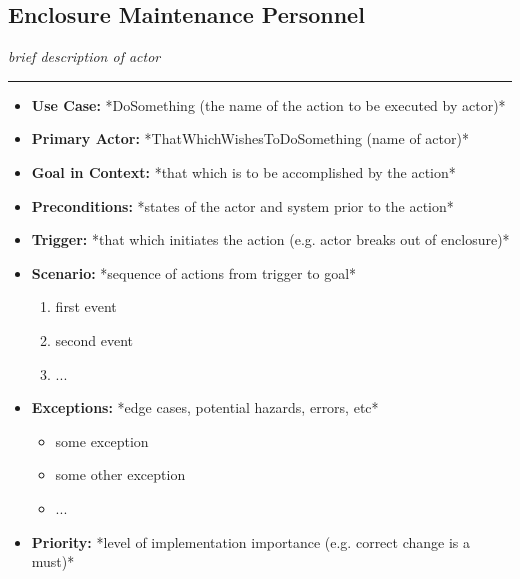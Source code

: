 \documentclass[12pt]{article}
\begin{document}
    \subsection{Enclosure Maintenance Personnel}
    \textit{brief description of actor}
    \par\noindent\rule{\textwidth}{0.4pt}    
    \begin{itemize}
        \item[]\textbf{Use Case:}                                
            *DoSomething (the name of the action to be executed by actor)*

        \item[]\textbf{Primary Actor:}
            *ThatWhichWishesToDoSomething (name of actor)*

        \item[]\textbf{Goal in Context:}
            *that which is to be accomplished by the action*

        \item[]\textbf{Preconditions:}
            *states of the actor and system prior to the action*

        \item[]\textbf{Trigger:}
            *that which initiates the action (e.g. actor breaks out of enclosure)*

        \item[]\textbf{Scenario:}
            *sequence of actions from trigger to goal*
            \begin{enumerate}
                \item first event
                \item second event
                \item ...
            \end{enumerate}

        \item[]\textbf{Exceptions:}
            *edge cases, potential hazards, errors, etc*
            \begin{itemize}
                \item[] some exception
                \item[] some other exception                
                \item[] ...
            \end{itemize}

        \item[]\textbf{Priority:}
            *level of implementation importance (e.g. correct change is a must)*


\end{itemize}
\end{document}
